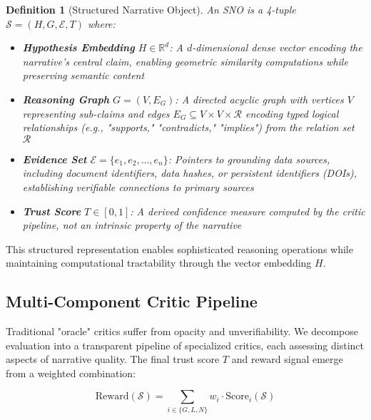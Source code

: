 \documentclass[12pt, a4paper]{article}
\newtheorem{definition}{Definition}[section]
\begin{document}
\begin{definition}[Structured Narrative Object]
An SNO is a 4-tuple $\mathcal{S} = (H, G, \mathcal{E}, T)$ where:
\begin{itemize}
    \item \textbf{Hypothesis Embedding} $H \in \mathbb{R}^d$: A $d$-dimensional dense vector encoding the narrative's central claim, enabling geometric similarity computations while preserving semantic content
    \item \textbf{Reasoning Graph} $G = (V, E_G)$: A directed acyclic graph with vertices $V$ representing sub-claims and edges $E_G \subseteq V \times V \times \mathcal{R}$ encoding typed logical relationships (e.g., "supports," "contradicts," "implies") from the relation set $\mathcal{R}$
    \item \textbf{Evidence Set} $\mathcal{E} = \{e_1, e_2, \ldots, e_n\}$: Pointers to grounding data sources, including document identifiers, data hashes, or persistent identifiers (DOIs), establishing verifiable connections to primary sources
    \item \textbf{Trust Score} $T \in [0, 1]$: A derived confidence measure computed by the critic pipeline, not an intrinsic property of the narrative
\end{itemize}
\end{definition}

This structured representation enables sophisticated reasoning operations while maintaining computational tractability through the vector embedding $H$.

\subsection{Multi-Component Critic Pipeline}
Traditional "oracle" critics suffer from opacity and unverifiability. We decompose evaluation into a transparent pipeline of specialized critics, each assessing distinct aspects of narrative quality. The final trust score $T$ and reward signal emerge from a weighted combination:

\begin{equation}
\text{Reward}(\mathcal{S}) = \sum_{i \in \{G, L, N\}} w_i \cdot \text{Score}_i(\mathcal{S})
\label{eq:reward}
\end{equation}
\end{document}
